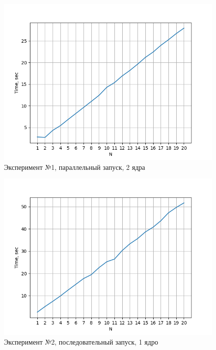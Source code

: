 \documentclass{article}
\begin{document}
\begin{figure}
    \centering
    \includegraphics[scale=0.7]{Graphic-4.png}
    \caption{Эксперимент №1, параллельный запуск, 2 ядра}
    \label{fig:enter-label}
\end{figure}

\begin{figure}
    \centering
    \includegraphics[scale=0.7]{Graphic-5.png}
    \caption{Эксперимент №2, последовательный запуск, 1 ядро}
    \label{fig:enter-label}
\end{figure}
\end{document}
